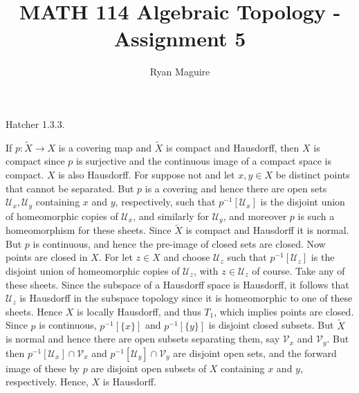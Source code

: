 \documentclass{article}                                                        %
\begin{document}
    \title{MATH 114 Algebraic Topology - Assignment 5}
    \author{Ryan Maguire}
    \date{\vspace{-5ex}}
    \maketitle
    \setcounter{section}{6}
    \begin{problem}
        Hatcher 1.3.3.
    \end{problem}
    \begin{solution}
        If $p:\tilde{X}\rightarrow{X}$ is a covering map and $\tilde{X}$ is
        compact and Hausdorff, then $X$ is compact since $p$ is surjective and
        the continuous image of a compact space is compact. $X$ is also
        Hausdorff. For suppose not and let $x,y\in{X}$ be distinct points that
        cannot be separated. But $p$ is a covering and hence there are open sets
        $\mathcal{U}_{x},\mathcal{U}_{y}$ containing $x$ and $y$, respectively,
        such that $p^{\minus{1}}[\mathcal{U}_{x}]$ is the disjoint union of
        homeomorphic copies of $\mathcal{U}_{x}$, and similarly for
        $\mathcal{U}_{y}$, and moreover $p$ is such a homeomorphism for these
        sheets. Since $\tilde{X}$ is compact and Hausdorff it is normal. But $p$
        is continuous, and hence the pre-image of closed sets are closed. Now
        points are closed in $X$. For let $z\in{X}$ and choose $\mathcal{U}_{z}$
        such that $p^{\minus{1}}[\mathcal{U}_{z}]$ is the disjoint union of
        homeomorphic copies of $\mathcal{U}_{z}$, with $z\in\mathcal{U}_{z}$ of
        course. Take any of these sheets. Since the subspace of a Hausdorff
        space is Hausdorff, it follows that $\mathcal{U}_{z}$ is Hausdorff in
        the subspace topology since it is homeomorphic to one of these sheets.
        Hence $X$ is locally Hausdorff, and thus $T_{1}$, which implies points
        are closed. Since $p$ is continuous, $p^{\minus{1}}[\{x\}]$ and
        $p^{\minus{1}}[\{y\}]$ is disjoint closed subsets. But $\tilde{X}$ is
        normal and hence there are open subsets separating them, say
        $\mathcal{V}_{x}$ and $\mathcal{V}_{y}$. But then
        $p^{\minus{1}}[\mathcal{U}_{x}]\cap\mathcal{V}_{x}$ and
        $p^{\minus{1}}[\mathcal{U}_{y}]\cap\mathcal{V}_{y}$ are disjoint open
        sets, and the forward image of these by $p$ are disjoint open subsets
        of $X$ containing $x$ and $y$, respectively. Hence, $X$ is Hausdorff.

\end{solution}
\end{document}
